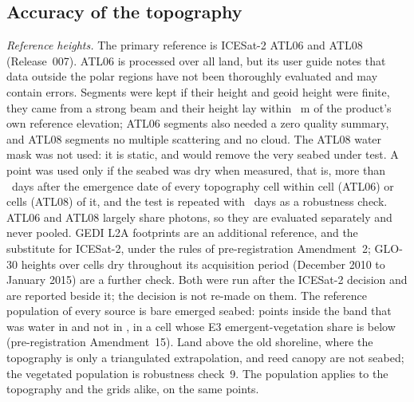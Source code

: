 \subsection*{Accuracy of the topography}
\emph{Reference heights.} The primary reference is ICESat-2 ATL06 and ATL08 (Release~007)\citep{atl06_v7,atl08_v7,markus2017}. ATL06 is processed over all land, but its user guide notes that data outside the polar regions have not been thoroughly evaluated and may contain errors\citep{atl06_v7}. Segments were kept if their height and geoid height were finite, they came from a strong beam and their height lay within ~m of the product's own reference elevation; ATL06 segments also needed a zero quality summary, and ATL08 segments no multiple scattering and no cloud. The ATL08 water mask was not used: it is static, and would remove the very seabed under test. A point was used only if the seabed was dry when measured, that is, more than ~days after the emergence date of every topography cell within  cell (ATL06) or  cells (ATL08) of it, and the test is repeated with ~days as a robustness check. ATL06 and ATL08 largely share photons, so they are evaluated separately and never pooled. GEDI L2A footprints\citep{gedi_l2a_v2} are an additional reference, and the substitute for ICESat-2, under the rules of pre-registration Amendment~2; GLO-30 heights over cells dry throughout its acquisition period (December 2010 to January 2015) are a further check. Both were run after the ICESat-2 decision and are reported beside it; the decision is not re-made on them. The reference population of every source is bare emerged seabed: points inside the band that was water in  and not in , in a cell whose E3 emergent-vegetation share is below  (pre-registration Amendment~15). Land above the old shoreline, where the topography is only a triangulated extrapolation, and reed canopy are not seabed; the vegetated population is robustness check~9. The population applies to the topography and the grids alike, on the same points.


